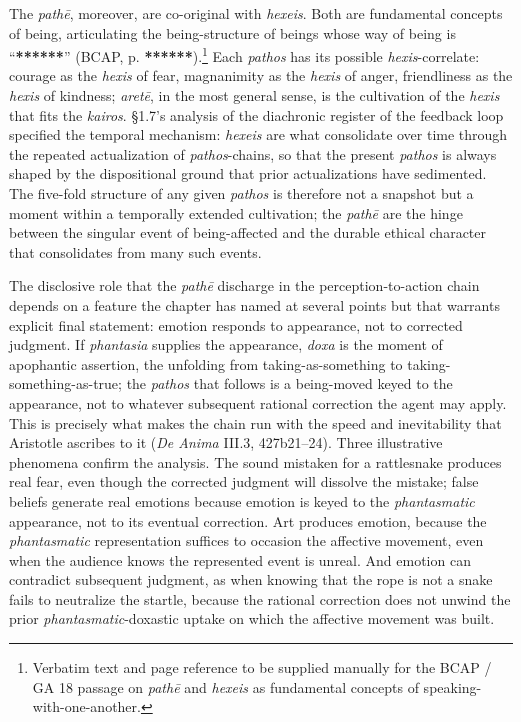 The \textit{pathē}, moreover, are co-original with \textit{hexeis}. Both are fundamental concepts of being, articulating the being-structure of beings whose way of being is ``\textbf{******}'' (BCAP, p. \textbf{******}).\footnote{Verbatim text and page reference to be supplied manually for the BCAP / GA 18 passage on \textit{pathē} and \textit{hexeis} as fundamental concepts of speaking-with-one-another.} Each \textit{pathos} has its possible \textit{hexis}-correlate: courage as the \textit{hexis} of fear, magnanimity as the \textit{hexis} of anger, friendliness as the \textit{hexis} of kindness; \textit{aretē}, in the most general sense, is the cultivation of the \textit{hexis} that fits the \textit{kairos}. \S1.7's analysis of the diachronic register of the feedback loop specified the temporal mechanism: \textit{hexeis} are what consolidate over time through the repeated actualization of \textit{pathos}-chains, so that the present \textit{pathos} is always shaped by the dispositional ground that prior actualizations have sedimented. The five-fold structure of any given \textit{pathos} is therefore not a snapshot but a moment within a temporally extended cultivation; the \textit{pathē} are the hinge between the singular event of being-affected and the durable ethical character that consolidates from many such events.

The disclosive role that the \textit{pathē} discharge in the perception-to-action chain depends on a feature the chapter has named at several points but that warrants explicit final statement: emotion responds to appearance, not to corrected judgment. If \textit{phantasia} supplies the appearance, \textit{doxa} is the moment of apophantic assertion, the unfolding from taking-as-something to taking-something-as-true; the \textit{pathos} that follows is a being-moved keyed to the appearance, not to whatever subsequent rational correction the agent may apply. This is precisely what makes the chain run with the speed and inevitability that Aristotle ascribes to it (\textit{De Anima} III.3, 427b21--24). Three illustrative phenomena confirm the analysis. The sound mistaken for a rattlesnake produces real fear, even though the corrected judgment will dissolve the mistake; false beliefs generate real emotions because emotion is keyed to the \textit{phantasmatic} appearance, not to its eventual correction. Art produces emotion, because the \textit{phantasmatic} representation suffices to occasion the affective movement, even when the audience knows the represented event is unreal. And emotion can contradict subsequent judgment, as when knowing that the rope is not a snake fails to neutralize the startle, because the rational correction does not unwind the prior \textit{phantasmatic}-doxastic uptake on which the affective movement was built.

